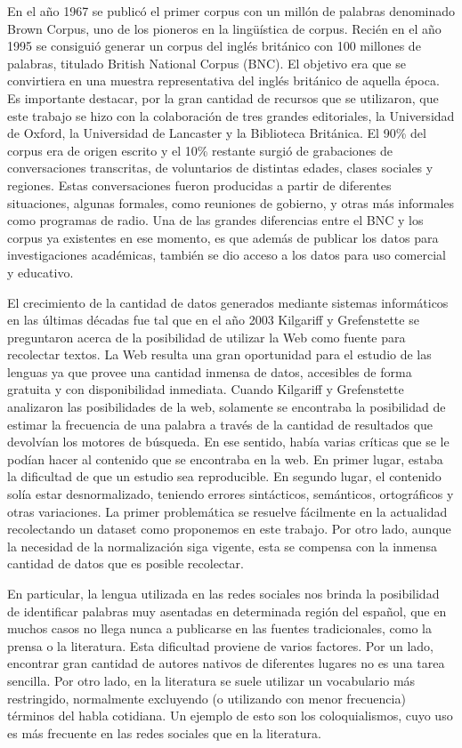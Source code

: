 En el año 1967 se publicó el primer corpus con un millón de palabras denominado Brown Corpus, uno de los pioneros en la lingüística de corpus. Recién en el año 1995 se consiguió generar un corpus del inglés británico con 100 millones de palabras, titulado British National Corpus (BNC). 
El objetivo era que se convirtiera en una muestra representativa del inglés británico de aquella época. 
Es importante destacar, por la gran cantidad de recursos que se utilizaron, que este trabajo se hizo con la colaboración de tres grandes editoriales, la Universidad de Oxford, la Universidad de Lancaster y la Biblioteca Británica. 
El 90\% del corpus era de origen escrito y el 10\% restante surgió de grabaciones de conversaciones transcritas, de voluntarios de distintas edades, clases sociales y regiones. 
Estas conversaciones fueron producidas a partir de diferentes situaciones, algunas formales, como reuniones de gobierno, y otras más informales como programas de radio. 
Una de las grandes diferencias entre el BNC y los corpus ya existentes en ese momento, es que además de publicar los datos para investigaciones académicas, también se dio acceso a los datos para uso comercial y educativo.

El crecimiento de la cantidad de datos generados mediante sistemas informáticos en las últimas décadas fue tal que en el año 2003 Kilgariff y Grefenstette \cite{kilgarriff2003introduction} se preguntaron acerca de la posibilidad de utilizar la Web como fuente para recolectar textos.
La Web resulta una gran oportunidad para el estudio de las lenguas ya que provee una cantidad inmensa de datos, accesibles de forma gratuita y con disponibilidad inmediata. Cuando Kilgariff y Grefenstette  analizaron las posibilidades de la web, solamente se encontraba la posibilidad de estimar la frecuencia de una palabra a través de la cantidad de resultados que devolvían los motores de búsqueda. En ese sentido, había varias críticas que se le podían hacer al contenido que se encontraba en la web. En primer lugar, estaba la dificultad de que un estudio sea reproducible. En segundo lugar, el contenido solía estar desnormalizado, teniendo errores sintácticos, semánticos, ortográficos y otras variaciones. La primer problemática se resuelve fácilmente en la actualidad recolectando un dataset como proponemos en este trabajo. Por otro lado, aunque la necesidad de la normalización siga vigente, esta se compensa con la inmensa cantidad de datos que es posible recolectar.

En particular, la lengua utilizada en las redes sociales nos brinda la posibilidad de identificar palabras muy asentadas en determinada región del español, que en muchos casos no llega nunca a publicarse en las fuentes tradicionales, como la prensa o la literatura. Esta dificultad proviene de varios factores. Por un lado, encontrar gran cantidad de autores nativos de diferentes lugares no es una tarea sencilla. Por otro lado, en la literatura se suele utilizar un vocabulario más restringido, normalmente excluyendo (o utilizando con menor frecuencia) términos del habla cotidiana. Un ejemplo de esto son los coloquialismos, cuyo uso es más frecuente en las redes sociales que en la literatura. 

